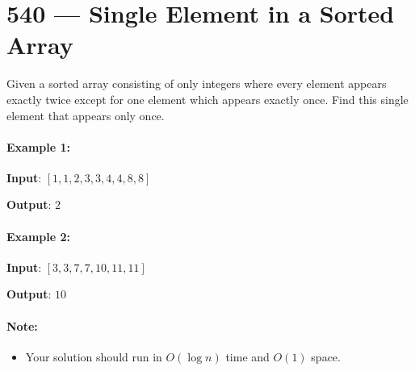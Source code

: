 \section{540 --- Single Element in a Sorted Array}
Given a sorted array consisting of only integers where every element appears exactly twice except for one element which appears exactly once. Find this single element that appears only once.


\paragraph{Example 1:}

\begin{flushleft}
\textbf{Input}: $[1,1,2,3,3,4,4,8,8]$

\textbf{Output}: $2$

\end{flushleft}

\paragraph{Example 2:}

\begin{flushleft}
\textbf{Input}: $[3,3,7,7,10,11,11]$

\textbf{Output}: $ 10$
\end{flushleft}

\paragraph{Note:}
\begin{itemize}
    \item Your solution should run in $O(\log n)$ time and $O(1)$ space.
\end{itemize}